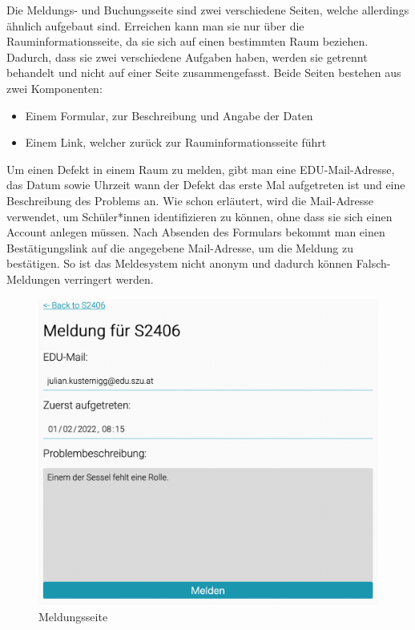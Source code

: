 
Die Meldungs- und Buchungsseite sind zwei verschiedene Seiten, welche allerdings ähnlich aufgebaut sind. Erreichen kann man sie nur über die Rauminformationsseite, da sie sich auf einen bestimmten Raum beziehen. Dadurch, dass sie zwei verschiedene Aufgaben haben, werden sie getrennt behandelt und nicht auf einer Seite zusammengefasst. Beide Seiten bestehen aus zwei Komponenten:
\begin{itemize}
    \item Einem Formular, zur Beschreibung und Angabe der Daten
    \item Einem Link, welcher zurück zur Rauminformationsseite führt
\end{itemize}

Um einen Defekt in einem Raum zu melden, gibt man eine EDU-Mail-Adresse, das Datum sowie Uhrzeit wann der Defekt das erste Mal aufgetreten ist und eine Beschreibung des Problems an. Wie schon erläutert, wird die Mail-Adresse verwendet, um Schüler*innen identifizieren zu können, ohne dass sie sich einen Account anlegen müssen. Nach Absenden des Formulars bekommt man einen Bestätigungslink auf die angegebene Mail-Adresse, um die Meldung zu bestätigen. So ist das Meldesystem nicht anonym und dadurch können Falsch-Meldungen verringert werden.

\begin{figure}[H]
    \centering
    \includegraphics[width=120mm]{media/WebComponents/Meldungsseite_light.png}
    \caption{Meldungsseite}
\end{figure}

